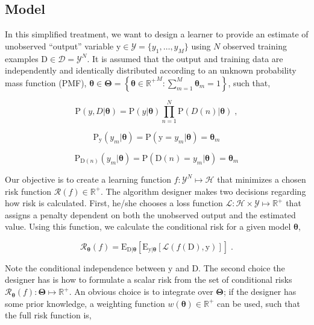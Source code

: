 \documentclass[12pt]{article}
\begin{document}
\subsection{Model}

In this simplified treatment, we want to design a learner to provide an estimate of unobserved ``output'' variable $\mathrm{y} \in \mathcal{Y} = \{ y_1, \ldots, y_M \}$ using $N$ observed training examples $\mathrm{D} \in \mathcal{D} = \mathcal{Y}^N$. It is assumed that the output and training data are independently and identically distributed according to an unknown probability mass function (PMF), $\bm{\theta} \in \bm{\Theta} = \left\{ \bm{\theta} \in {\mathbb{R}^+}^M: \sum_{m=1}^M \bm{\theta}_m = 1 \right\} $, such that,

\begin{equation}
\text{P}(y,D | \bm{\theta}) = \text{P}(y | \bm{\theta}) \prod_{n=1}^N \text{P}(D(n) | \bm{\theta}) \;,
\end{equation}

\begin{equation}
\text{P}_{\mathrm{y}}(y_m|\bm{\theta}) = \text{P}(\mathrm{y} = y_m | \bm{\theta}) = \bm{\theta}_m
\end{equation}

\begin{equation}
\text{P}_{\mathrm{D}(n)}(y_m|\bm{\theta}) = \text{P}(\mathrm{D}(n) = y_m | \bm{\theta}) = \bm{\theta}_m
\end{equation}


Our objective is to create a learning function $f: \mathcal{Y}^N \mapsto \mathcal{H}$ that minimizes a chosen risk function $\mathcal{R}(f) \in \mathbb{R}^+$.  The algorithm designer makes two decisions regarding how risk is calculated. First, he/she chooses a loss function $\mathcal{L}: \mathcal{H} \times \mathcal{Y} \mapsto \mathbb{R}^+$ that assigns a penalty dependent on both the unobserved output and the estimated value. Using this function, we calculate the conditional risk for a given model $\bm{\theta}$,

\begin{equation}
\mathcal{R}_{\bm{\theta}}(f) = \text{E}_{\mathrm{D}|\bm{\theta}} \left[ \text{E}_{\mathrm{y}|\bm{\theta}} \left[ \mathcal{L}(f(\mathrm{D}),\mathrm{y}) \right] \right] \;.
\end{equation}

Note the conditional independence between $\mathrm{y}$ and $\mathrm{D}$. The second choice the designer has is how to formulate a scalar risk from the set of conditional risks $\mathcal{R}_{\bm{\theta}}(f): \bm{\Theta} \mapsto \mathbb{R}^+$. An obvious choice is to integrate over $\bm{\Theta}$; if the designer has some prior knowledge, a weighting function $w(\bm{\theta}) \in \mathbb{R}^+$ can be used, such that the full risk function is,
\end{document}
